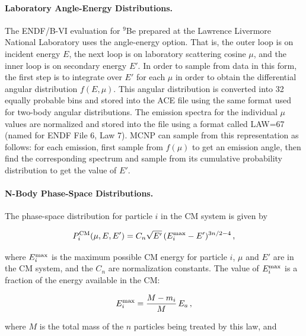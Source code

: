 \paragraph{Laboratory Angle-Energy Distributions.}
The ENDF/B-VI evaluation for $^{9}$Be prepared at the
Lawrence Livermore National Laboratory uses the angle-energy option.
That is, the outer loop is on incident energy $E$, the next
loop is on laboratory scattering cosine $\mu$, and the inner loop
is on secondary energy $E'$.  In order to sample from data in
this form, the first step is to integrate over $E'$ for each
$\mu$ in order to obtain the differential angular distribution
$f(E,\mu)$.  This angular distribution is converted into 32
equally probable bins and stored into the ACE file using the
same format used for two-body angular distributions.  The
emission spectra for the individual $\mu$ values
are normalized and stored into the file using a format called
LAW=67 (named for ENDF File 6, Law 7).  MCNP can sample from this
representation as follows:  for each emission, first sample from
$f(\mu)$ to get an emission angle, then find the corresponding
spectrum and sample from its cumulative probability distribution
to get the value of $E'$.

\paragraph{N-Body Phase-Space Distributions.}

The phase-space distribution for particle $i$ in the CM system
is given by

\begin{equation}
   P_i^{\rm CM}(\mu,E,E')=C_n\sqrt{E'}\,(E_i^{\rm max}-E')^{3n/2-4}\,,
\end{equation}
\vspace{0.5 pt}

\noindent
where $E_i^{\rm max}$ is the maximum possible CM energy for particle
$i$, $\mu$ and $E'$ are in the CM system, and the $C_n$ are
normalization constants.  The value of $E_i^{\rm max}$ is a fraction
of the energy available in the CM:

\begin{equation}
   E_i^{\rm max}=\frac{M-m_i}{M}\,E_a\,,
\end{equation}

\noindent
where $M$ is the total mass of the $n$ particles being treated
by this law, and

